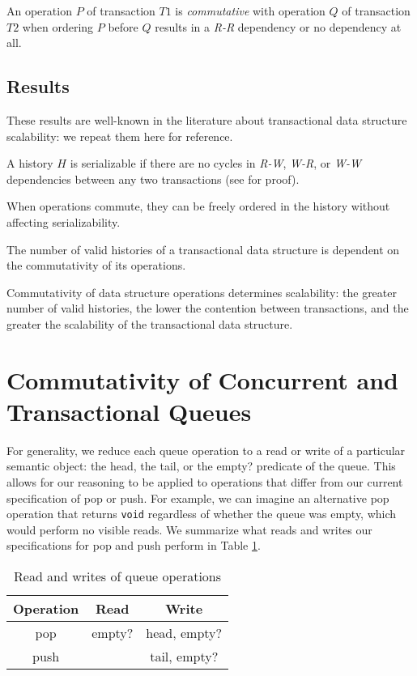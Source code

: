 \begin{defn}
    An operation $P$ of transaction $T1$ is \emph{commutative} with operation $Q$ of transaction $T2$ when ordering $P$ before $Q$ results in a \emph{R-R} dependency or no dependency at all.
\end{defn}

\subsection{Results}

These results are well-known in the literature about transactional data structure scalability: we repeat them here for reference.
\begin{theorem}
    A history $H$ is serializable if there are no cycles in \emph{R-W}, \emph{W-R}, or \emph{W-W} dependencies between any two transactions (see \cite{schwarz} for proof).
\end{theorem}

\begin{corollary}
    When operations commute, they can be freely ordered in the history without affecting serializability.
\end{corollary}
\begin{corollary}
    The number of valid histories of a transactional data structure is dependent on the commutativity of its operations.
\end{corollary}
\begin{corollary}
    Commutativity of data structure operations determines scalability: the greater number of valid histories, the lower the contention between transactions, and the greater the scalability of the transactional data structure. 
\end{corollary}


\section{Commutativity of Concurrent and Transactional Queues}

For generality, we reduce each queue operation to a read or write of a particular semantic object: the head, the tail, or the empty? predicate of the queue. This allows for our reasoning to be applied to operations that differ from our current specification of pop or push. For example, we can imagine an alternative pop operation that returns \texttt{void} regardless of whether the queue was empty, which would perform no visible reads. We summarize what reads and writes our specifications for pop and push perform in Table \ref{table:qrw}.
\begin{table}[h!]
\centering
\begin{tabular}{c||c|c}
    Operation & Read & Write\\
    \hline
    pop & empty? & head, empty?\\
    push & & tail, empty?\\
\end{tabular}
    \caption{Read and writes of queue operations}
    \label{table:qrw}
\end{table}

